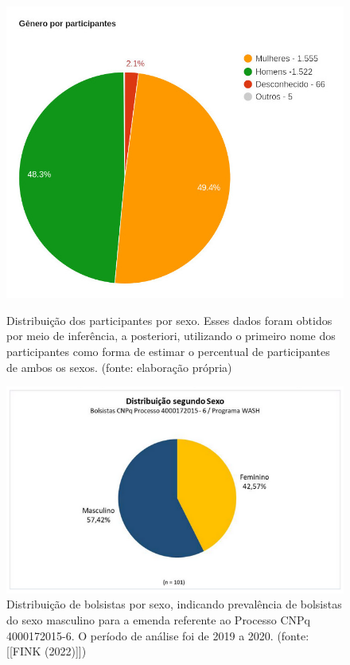 \captionsetup{format=plain}
\begin{figure}[htb]

\centering


\begin{minipage}[b]{0.4\linewidth}
        \centering
                \includegraphics[width=1.0\linewidth]{../../../imagens/genero-todos-crop.jpeg}
                \caption{Distribuição dos participantes por sexo. Esses dados foram obtidos por meio de inferência, a posteriori, utilizando o primeiro nome dos participantes como forma de estimar o percentual de participantes de ambos os sexos. (fonte: elaboração própria)}
                \label{ef11d820efb73d78fb64eb6bdd03853471a8e89f}
\end{minipage}%
\hspace{0.5cm}
\begin{minipage}[b]{0.4\linewidth}
        \centering
                \includegraphics[width=1.0\linewidth]{../../../imagens/distribuicao-sexo-bolsistas.png}
                \caption{Distribuição de bolsistas por sexo, indicando prevalência de bolsistas do sexo masculino para a emenda referente ao Processo CNPq 4000172015-6. O período de análise foi de 2019 a 2020. (fonte: [[FINK (2022)]])}
                \label{1164a3115bd14e3f25b6b141840652ffbd0d2374}
\end{minipage}
\hspace{0.5cm}
\end{figure}
